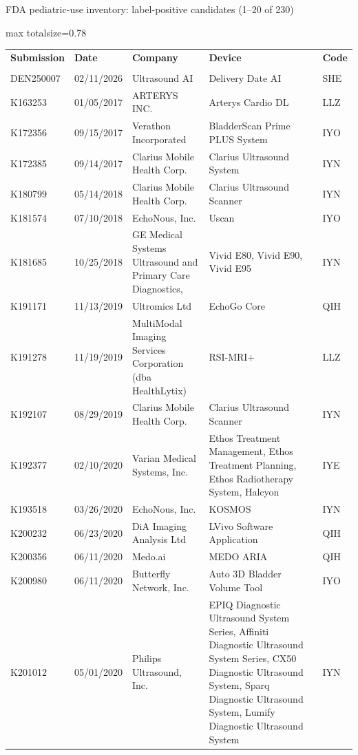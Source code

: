 \documentclass[aspectratio=169]{beamer}
\renewcommand{\arraystretch}{1.08}
\begin{document}
\begin{frame}[category=FDA appendix]{FDA pediatric-use inventory: label-positive candidates (1--20 of 230)}
\begin{adjustbox}{max totalsize={\textwidth}{0.78\textheight}}
\renewcommand{\arraystretch}{1.2}
\begin{tabular}{|p{}|p{}|p{}|p{}|p{}|}
\hline \textbf{Submission} & \textbf{Date} & \textbf{Company} & \textbf{Device} & \textbf{Code} \\\\ \hline
DEN250007 & 02/11/2026 & Ultrasound AI & Delivery Date AI & SHE \\ \hline
K163253 & 01/05/2017 & ARTERYS INC. & Arterys Cardio DL & LLZ \\ \hline
K172356 & 09/15/2017 & Verathon Incorporated & BladderScan Prime PLUS System & IYO \\ \hline
K172385 & 09/14/2017 & Clarius Mobile Health Corp. & Clarius Ultrasound System & IYN \\ \hline
K180799 & 05/14/2018 & Clarius Mobile Health Corp. & Clarius Ultrasound Scanner & IYN \\ \hline
K181574 & 07/10/2018 & EchoNous, Inc. & Uscan & IYO \\ \hline
K181685 & 10/25/2018 & GE Medical Systems Ultrasound and Primary Care Diagnostics, & Vivid E80, Vivid E90, Vivid E95 & IYN \\ \hline
K191171 & 11/13/2019 & Ultromics Ltd & EchoGo Core & QIH \\ \hline
K191278 & 11/19/2019 & MultiModal Imaging Services Corporation (dba HealthLytix) & RSI-MRI+ & LLZ \\ \hline
K192107 & 08/29/2019 & Clarius Mobile Health Corp. & Clarius Ultrasound Scanner & IYN \\ \hline
K192377 & 02/10/2020 & Varian Medical Systems, Inc. & Ethos Treatment Management, Ethos Treatment Planning, Ethos Radiotherapy System, Halcyon & IYE \\ \hline
K193518 & 03/26/2020 & EchoNous, Inc. & KOSMOS & IYN \\ \hline
K200232 & 06/23/2020 & DiA Imaging Analysis Ltd & LVivo Software Application & QIH \\ \hline
K200356 & 06/11/2020 & Medo.ai & MEDO ARIA & QIH \\ \hline
K200980 & 06/11/2020 & Butterfly Network, Inc. & Auto 3D Bladder Volume Tool & IYO \\ \hline
K201012 & 05/01/2020 & Philips Ultrasound, Inc. & EPIQ Diagnostic Ultrasound System Series, Affiniti Diagnostic Ultrasound System Series, CX50 Diagnostic Ultrasound System, Sparq Diagnostic Ultrasound System, Lumify Diagnostic Ultrasound System & IYN \\ \hline

\end{tabular}
\end{adjustbox}
\end{frame}
\end{document}
